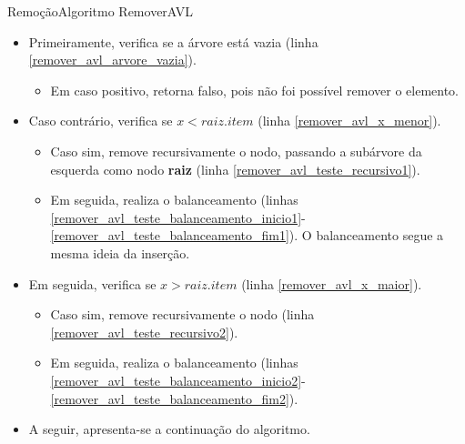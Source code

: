 \documentclass[aspectratio=169]{beamer}
\begin{document}
\begin{frame}{Remoção}{Algoritmo RemoverAVL}
\begin{itemize}
\item Primeiramente, verifica se a árvore está vazia (linha \ref{remover_avl_arvore_vazia}).
\begin{itemize}
\item Em caso positivo, retorna falso, pois não foi possível remover o elemento.
\end{itemize} 
\item Caso contrário, verifica se $x < raiz.item$ (linha \ref{remover_avl_x_menor}).
\begin{itemize}
\item Caso sim, remove recursivamente o nodo, passando a subárvore da esquerda como nodo {\bf raiz} (linha \ref{remover_avl_teste_recursivo1}).
\item Em seguida, realiza o balanceamento (linhas \ref{remover_avl_teste_balanceamento_inicio1}-\ref{remover_avl_teste_balanceamento_fim1}). O balanceamento segue a mesma ideia da inserção.
\end{itemize}
\item Em seguida, verifica se $x > raiz.item$ (linha \ref{remover_avl_x_maior}).
\begin{itemize}
\item Caso sim, remove recursivamente o nodo (linha \ref{remover_avl_teste_recursivo2}).
\item Em seguida, realiza o balanceamento (linhas \ref{remover_avl_teste_balanceamento_inicio2}-\ref{remover_avl_teste_balanceamento_fim2}).
\end{itemize}
\item A seguir, apresenta-se a continuação do algoritmo.
\end{itemize}
\end{frame}


\end{document}
